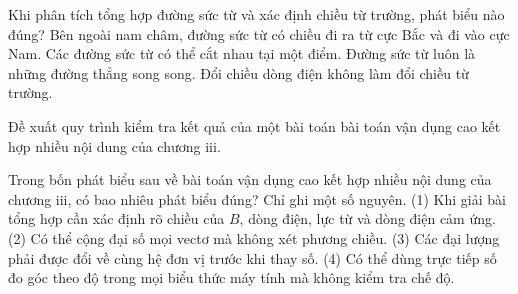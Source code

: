 \begin{ex}
Khi phân tích tổng hợp đường sức từ và xác định chiều từ trường, phát biểu nào đúng?
\choice
{\True Bên ngoài nam châm, đường sức từ có chiều đi ra từ cực Bắc và đi vào cực Nam.}
{Các đường sức từ có thể cắt nhau tại một điểm.}
{Đường sức từ luôn là những đường thẳng song song.}
{Đổi chiều dòng điện không làm đổi chiều từ trường.}
\end{ex}

\begin{bt}
Đề xuất quy trình kiểm tra kết quả của một bài toán bài toán vận dụng cao kết hợp nhiều nội dung của chương iii.
\end{bt}

\begin{ex}
Trong bốn phát biểu sau về bài toán vận dụng cao kết hợp nhiều nội dung của chương iii, có bao nhiêu phát biểu đúng? Chỉ ghi một số nguyên. (1) Khi giải bài tổng hợp cần xác định rõ chiều của $B$, dòng điện, lực từ và dòng điện cảm ứng. (2) Có thể cộng đại số mọi vectơ mà không xét phương chiều. (3) Các đại lượng phải được đổi về cùng hệ đơn vị trước khi thay số. (4) Có thể dùng trực tiếp số đo góc theo độ trong mọi biểu thức máy tính mà không kiểm tra chế độ.
\end{ex}

